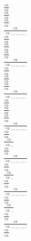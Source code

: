 \documentclass[11pt]{article}
\begin{document}
\begin{center}
\bigskip
\\$\frac{\Rightarrow }{\Rightarrow }$
\bigskip
\\$\frac{\Rightarrow }{\Rightarrow }$
\bigskip
\\$\frac{\Rightarrow }{\Rightarrow }$
\bigskip
\\$\frac{\Rightarrow }{\Rightarrow , , , , , , , }$
\bigskip
\\$\frac{\Rightarrow }{\Rightarrow }$
\bigskip
\\$\frac{\Rightarrow }{\Rightarrow }$
\bigskip
\\$\frac{\Rightarrow }{\Rightarrow }$
\bigskip
\\$\frac{\Rightarrow }{\Rightarrow , , , , , , , }$
\bigskip
\\$\frac{\Rightarrow }{\Rightarrow }$
\bigskip
\\$\frac{\Rightarrow }{\Rightarrow }$
\bigskip
\\$\frac{\Rightarrow }{\Rightarrow }$
\bigskip
\\$\frac{\Rightarrow }{\Rightarrow , , , , , , , }$
\bigskip
\\$\frac{\Rightarrow }{\Rightarrow }$
\bigskip
\\$\frac{\Rightarrow }{\Rightarrow }$
\bigskip
\\$\frac{\Rightarrow }{\Rightarrow }$
\bigskip
\\$\frac{\Rightarrow }{\Rightarrow , , , , , , , }$
\bigskip
\\$\frac{\Rightarrow }{\Rightarrow }$
\bigskip
\\$\frac{\Rightarrow }{\Rightarrow , }$
\bigskip
\\$\frac{\Rightarrow }{\Rightarrow }$
\bigskip
\\$\frac{\Rightarrow }{\Rightarrow , , , , , , , }$
\bigskip
\\$\frac{\Rightarrow }{\Rightarrow }$
\bigskip
\\$\frac{\Rightarrow }{\Rightarrow , }$
\bigskip
\\$\frac{\Rightarrow }{\Rightarrow }$
\bigskip
\\$\frac{\Rightarrow }{\Rightarrow , , , , , , , }$
\bigskip
\\$\frac{\Rightarrow }{\Rightarrow }$
\bigskip
\\$\frac{\Rightarrow }{\Rightarrow , }$
\bigskip
\\$\frac{\Rightarrow }{\Rightarrow }$
\bigskip
\\$\frac{\Rightarrow }{\Rightarrow , , , , , , , }$
\bigskip
\\$\frac{\Rightarrow }{\Rightarrow }$

\end{center}
\end{document}
